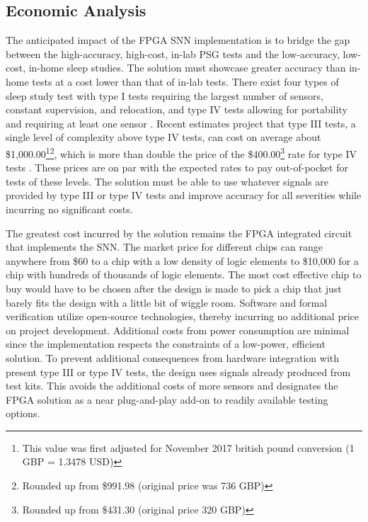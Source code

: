 \documentclass[12pt,titlepage]{article}
\begin{document}
\subsection{Economic Analysis}
The anticipated impact of the FPGA SNN implementation is to bridge the gap between the high-accuracy, high-cost, in-lab PSG tests and the
low-accuracy, low-cost, in-home sleep studies. The solution must showcase greater accuracy than in-home tests at a cost lower than that of
in-lab tests. There exist four types of sleep study test with type I tests requiring the largest number of sensors, constant supervision,
and relocation, and type IV tests allowing for portability and requiring at least one sensor \cite{elsevier}. Recent estimates project that
type III tests, a single level of complexity above type IV tests, can cost on average about \$1,000.00\footnote[1]{This value was first
adjusted for November 2017 british pound conversion (1 GBP = 1.3478 USD)}\footnote{Rounded up from \$991.98 (original price was 736 GBP)},
which is more than double the price of the \$400.00\footnotemark[1]\footnote{Rounded up from \$431.30 (original price 320 GBP)} rate for
type IV tests \cite{chai}. These prices are on par with the expected rates to pay out-of-pocket for tests of these
levels. The solution must be able to use whatever signals are provided by type III or type IV tests and improve accuracy for all severities
while incurring no significant costs. 

The greatest cost incurred by the solution remains the FPGA integrated circuit that implements the SNN. The market price for different
chips can range anywhere from \$60 to a chip with a low density of logic elements to \$10,000 for a chip with hundreds of thousands of
logic elements. The most cost effective chip to buy would have to be chosen after the design is made to pick a chip that just barely fits
the design with a little bit of wiggle room. Software and formal verification utilize open-source technologies, thereby incurring no
additional price on project development. Additional costs from power consumption are minimal since the implementation respects the
constraints of a low-power, efficient solution. To prevent additional consequences from hardware integration with present type III or
type IV tests, the design uses signals already produced from test kits. This avoids the additional costs of more sensors and designates
the FPGA solution as a near plug-and-play add-on to readily available testing options.
\end{document}
